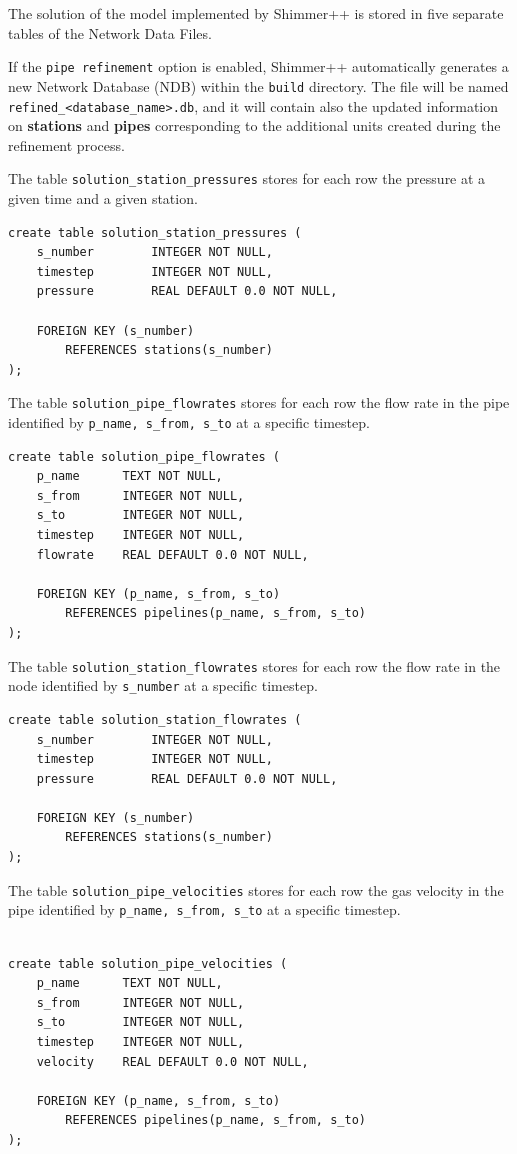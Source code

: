 The solution of the model implemented by Shimmer++ is stored in five separate
tables of the Network Data Files.
\begin{remark}
If the \texttt{pipe refinement} option is enabled, Shimmer++ automatically generates a new 
Network Database (NDB) within the \texttt{build} directory. 
The file will be named \texttt{refined\_<database\_name>.db}, and it will contain also the updated 
information on \textbf{stations} and \textbf{pipes} corresponding to the additional units 
created during the refinement process.
\end{remark}
The table \texttt{solution\_station\_pressures} stores for each row the pressure
at a given time and a given station.
\begin{verbatim}
create table solution_station_pressures (
    s_number        INTEGER NOT NULL,
    timestep        INTEGER NOT NULL,
    pressure        REAL DEFAULT 0.0 NOT NULL,
    
    FOREIGN KEY (s_number)
        REFERENCES stations(s_number)
);
\end{verbatim}

The table \texttt{solution\_pipe\_flowrates} stores for each row the flow rate
in the pipe identified by \texttt{p\_name, s\_from, s\_to} at a specific timestep.
\begin{verbatim}
create table solution_pipe_flowrates (
    p_name      TEXT NOT NULL,
    s_from      INTEGER NOT NULL,
    s_to        INTEGER NOT NULL,
    timestep    INTEGER NOT NULL,
    flowrate    REAL DEFAULT 0.0 NOT NULL,

    FOREIGN KEY (p_name, s_from, s_to)
        REFERENCES pipelines(p_name, s_from, s_to)
);
\end{verbatim}

The table \texttt{solution\_station\_flowrates} stores for each row the flow rate
in the node identified by \texttt{s\_number} at a specific timestep.
\begin{verbatim}
create table solution_station_flowrates (
    s_number        INTEGER NOT NULL,
    timestep        INTEGER NOT NULL,
    pressure        REAL DEFAULT 0.0 NOT NULL,
    
    FOREIGN KEY (s_number)
        REFERENCES stations(s_number)
);
\end{verbatim}

The table \texttt{solution\_pipe\_velocities} stores for each row the gas velocity
in the pipe identified by \texttt{p\_name, s\_from, s\_to} at a specific timestep.
\begin{verbatim}

create table solution_pipe_velocities (
    p_name      TEXT NOT NULL,
    s_from      INTEGER NOT NULL,
    s_to        INTEGER NOT NULL,
    timestep    INTEGER NOT NULL,
    velocity    REAL DEFAULT 0.0 NOT NULL,

    FOREIGN KEY (p_name, s_from, s_to)
        REFERENCES pipelines(p_name, s_from, s_to)
);
\end{verbatim}

